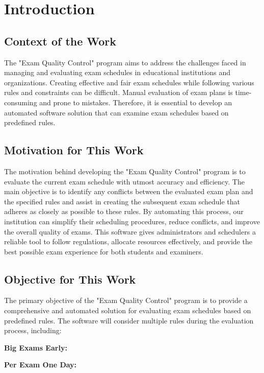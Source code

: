 \newpage
\tableofcontents


\newpage
{} 

\section{Introduction}
\subsection{Context of the Work}
The "Exam Quality Control" program aims to address the challenges faced in managing and evaluating exam schedules in educational institutions and organizations. Creating effective and fair exam schedules while following various rules and constraints can be difficult. Manual evaluation of exam plans is time-consuming and prone to mistakes. Therefore, it is essential to develop an automated software solution that can examine exam schedules based on predefined rules.
\subsection{Motivation for This Work}
The motivation behind developing the "Exam Quality Control" program is to evaluate the current exam schedule with utmost accuracy and efficiency. The main objective is to identify any conflicts between the evaluated exam plan and the specified rules and assist in creating the subsequent exam schedule that adheres as closely as possible to these rules. By automating this process, our institution can simplify their scheduling procedures, reduce conflicts, and improve the overall quality of exams. This software gives administrators and schedulers a reliable tool to follow regulations, allocate resources effectively, and provide the best possible exam experience for both students and examiners.
\subsection{Objective for This Work}
The primary objective of the "Exam Quality Control" program is to provide a comprehensive and automated solution for evaluating exam schedules based on predefined rules. The software will consider multiple rules during the evaluation process, including:\vspace{\baselineskip}

    \textbf{Big Exams Early:} \vspace{\baselineskip}
    
    \textbf{Per Exam One Day:} \vspace{\baselineskip}
    
